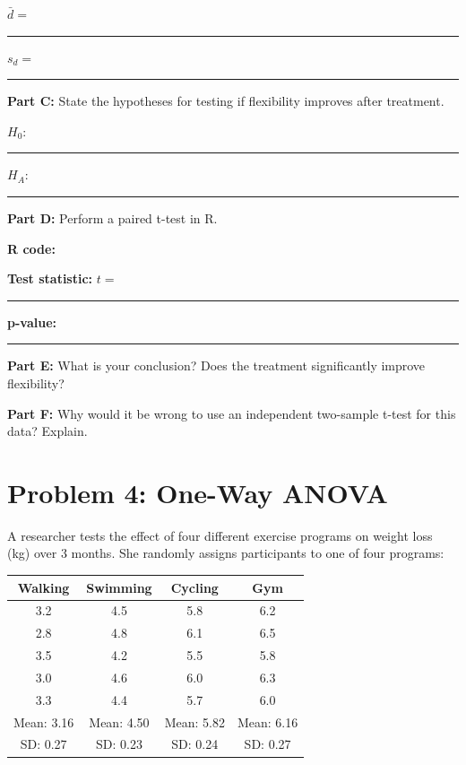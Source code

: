 \documentclass[11pt]{article}
\begin{document}
$\bar{d} = $ \rule{2cm}{0.4pt} \hspace{2cm} $s_d = $ \rule{2cm}{0.4pt}

\vspace{0.5cm}

\textbf{Part C:} State the hypotheses for testing if flexibility improves after treatment.

\vspace{0.3cm}

$H_0$: \rule{8cm}{0.4pt}

\vspace{0.5cm}

$H_A$: \rule{8cm}{0.4pt}

\vspace{0.5cm}

\textbf{Part D:} Perform a paired t-test in R.

\vspace{0.3cm}

\textbf{R code:}

\vspace{3cm}

\textbf{Test statistic:} $t = $ \rule{2cm}{0.4pt} \hspace{1cm} \textbf{p-value:} \rule{2cm}{0.4pt}

\vspace{0.5cm}

\textbf{Part E:} What is your conclusion? Does the treatment significantly improve flexibility?

\vspace{2.5cm}

\textbf{Part F:} Why would it be wrong to use an independent two-sample t-test for this data? Explain.

\vspace{3cm}

\newpage

\section{Problem 4: One-Way ANOVA}

A researcher tests the effect of four different exercise programs on weight loss (kg) over 3 months. She randomly assigns participants to one of four programs:

\vspace{0.3cm}

\begin{center}
\begin{tabular}{cccc}
\toprule
Walking & Swimming & Cycling & Gym \\
\midrule
3.2 & 4.5 & 5.8 & 6.2 \\
2.8 & 4.8 & 6.1 & 6.5 \\
3.5 & 4.2 & 5.5 & 5.8 \\
3.0 & 4.6 & 6.0 & 6.3 \\
3.3 & 4.4 & 5.7 & 6.0 \\
\midrule
Mean: 3.16 & Mean: 4.50 & Mean: 5.82 & Mean: 6.16 \\
SD: 0.27 & SD: 0.23 & SD: 0.24 & SD: 0.27 \\
\bottomrule
\end{tabular}
\end{center}
\end{document}
